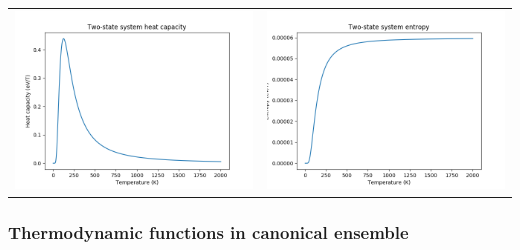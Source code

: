\documentclass[11pt]{article}
\begin{document}
\begin{table}
\begin{tabular}{cc}
\includegraphics[scale=0.5]{Images/2state-heatcapacity.png} & \includegraphics[scale=0.5]{Images/2state-entropy.png}
\end{tabular}
\end{table}

\subsubsection{Thermodynamic functions in canonical ensemble}
\label{sec:org8aa4a97}
\end{document}
